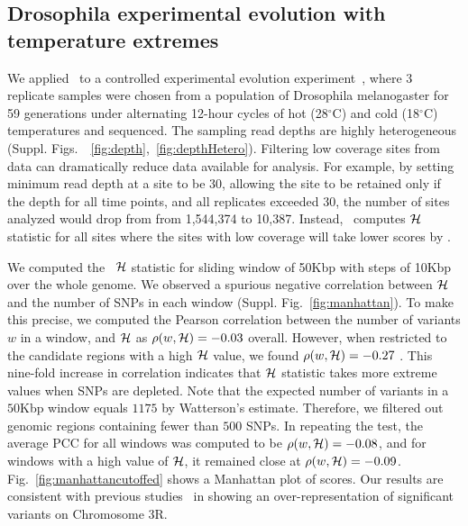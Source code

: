 \documentclass[11pt]{article}
\def\comale{\text{{\sc Comale}}}
\begin{document}
\subsection{Drosophila experimental evolution with temperature extremes}
We applied \comale\ to a controlled experimental evolution
experiment~\cite{orozco2012adaptation}, where $3$ replicate samples
were chosen from a population of Drosophila melanogaster for 59
generations under alternating 12-hour cycles of hot (28$^{\circ}$C)
and cold (18$^{\circ}$C) temperatures and sequenced. The sampling read
depths are highly heterogeneous
(Suppl. Figs.~~\ref{fig:depth},~\ref{fig:depthHetero}). Filtering
low coverage sites from data can dramatically reduce data available
for analysis. For example, by setting minimum read depth at a site to
be $30$, allowing the site to be retained only if the depth for all
time points, and all replicates exceeded $30$, the number of sites
analyzed would drop from from 1,544,374 to 10,387. Instead, \comale\
computes ${\cal H}$ statistic for all sites where the sites with low coverage will 
take lower scores by \comale.

We computed the \comale\ ${\cal H}$ statistic for sliding
window of 50Kbp with steps of 10Kbp over the whole genome. We observed
a spurious negative correlation between ${\cal H}$ and the number of SNPs
in each window (Suppl. Fig.~\ref{fig:manhattan}). To make this
precise, we computed the Pearson correlation between the number of
variants $w$ in a window, and ${\cal H}$ as $\rho(w,{\cal H})=-0.03$
overall. However, when restricted to the candidate regions with a high
${\cal H}$ value, we found $\rho(w,{\cal H})=-0.27$ . This nine-fold increase in
correlation indicates that ${\cal H}$ statistic takes more extreme values
when SNPs are depleted. Note that the expected number of variants in a
$50$Kbp window equals $1175$ by Watterson's estimate. Therefore, we
filtered out genomic regions containing fewer than $500$ SNPs. In
repeating the test, the average PCC for all windows was computed to be
$\rho(w,{\cal H})=-0.08$, and for windows with a high value of ${\cal H}$, it
remained close at
$\rho(w,{\cal H})=-0.09$. Fig.~\ref{fig:manhattancutoffed} shows a
Manhattan plot of scores. Our results are consistent with previous
studies~\cite{orozco2012adaptation} in showing an over-representation
of significant variants on Chromosome 3R.
\end{document}
